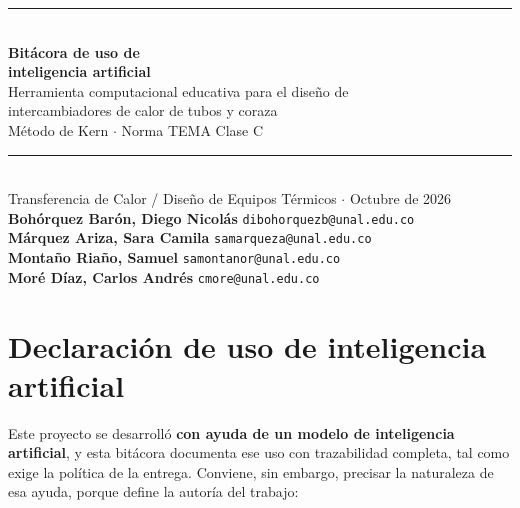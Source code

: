 \documentclass[11pt,a4paper]{article}
\begin{document}
\begin{center}
{\color{acento}\rule{\linewidth}{2pt}}\\[1.2cm]
{\Huge\bfseries\color{morado} Bitácora de uso de\\[0.4em]
inteligencia artificial}\\[0.6em]
{\Large\color{acento} Herramienta computacional educativa para el diseño de\\
intercambiadores de calor de tubos y coraza}\\[0.5em]
{\large\color{gristexto} Método de Kern $\cdot$ Norma TEMA Clase C}\\[0.8cm]
{\color{acento}\rule{\linewidth}{1pt}}\\[0.6cm]
{\large\color{gristexto} Transferencia de Calor / Diseño de Equipos Térmicos
\quad $\cdot$ \quad Octubre de 2026}\\[0.8cm]
{\large\color{gristexto}
\textbf{Boh\'orquez Bar\'on, Diego Nicol\'as} \quad \texttt{dibohorquezb@unal.edu.co}\\[0.25em]
\textbf{M\'arquez Ariza, Sara Camila} \quad \texttt{samarqueza@unal.edu.co}\\[0.25em]
\textbf{Monta\~no Ria\~no, Samuel} \quad \texttt{samontanor@unal.edu.co}\\[0.25em]
\textbf{Mor\'e D\'iaz, Carlos Andr\'es} \quad \texttt{cmore@unal.edu.co}}
\end{center}
\vspace{1.2cm}

\section{Declaración de uso de inteligencia artificial}

Este proyecto se desarrolló \textbf{con ayuda de un modelo de inteligencia
artificial}, y esta bitácora documenta ese uso con trazabilidad completa, tal
como exige la política de la entrega. Conviene, sin embargo, precisar la
naturaleza de esa ayuda, porque define la autoría del trabajo:
\end{document}
